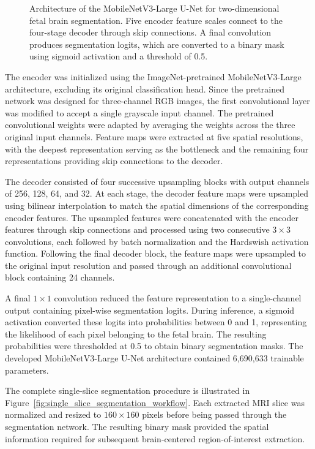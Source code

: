 \begin{figure}[htbp]
\centering

\caption{Architecture of the MobileNetV3-Large U-Net for two-dimensional fetal brain segmentation. Five encoder feature scales connect to the four-stage decoder through skip connections. A final convolution produces segmentation logits, which are converted to a binary mask using sigmoid activation and a threshold of 0.5.}
\label{fig:mobilenetv3_unet_architecture}
\end{figure}

The encoder was initialized using the ImageNet-pretrained MobileNetV3-Large architecture, excluding its original classification head. Since the pretrained network was designed for three-channel RGB images, the first convolutional layer was modified to accept a single grayscale input channel. The pretrained convolutional weights were adapted by averaging the weights across the three original input channels. Feature maps were extracted at five spatial resolutions, with the deepest representation serving as the bottleneck and the remaining four representations providing skip connections to the decoder.

The decoder consisted of four successive upsampling blocks with output channels of 256, 128, 64, and 32. At each stage, the decoder feature maps were upsampled using bilinear interpolation to match the spatial dimensions of the corresponding encoder features. The upsampled features were concatenated with the encoder features through skip connections and processed using two consecutive $3 \times 3$ convolutions, each followed by batch normalization and the Hardswish activation function. Following the final decoder block, the feature maps were upsampled to the original input resolution and passed through an additional convolutional block containing 24 channels.

A final $1 \times 1$ convolution reduced the feature representation to a single-channel output containing pixel-wise segmentation logits. During inference, a sigmoid activation converted these logits into probabilities between 0 and 1, representing the likelihood of each pixel belonging to the fetal brain. The resulting probabilities were thresholded at 0.5 to obtain binary segmentation masks. The developed MobileNetV3-Large U-Net architecture contained 6,690,633 trainable parameters.

The complete single-slice segmentation procedure is illustrated in Figure~\ref{fig:single_slice_segmentation_workflow}. Each extracted MRI slice was normalized and resized to $160 \times 160$ pixels before being passed through the segmentation network. The resulting binary mask provided the spatial information required for subsequent brain-centered region-of-interest extraction.

